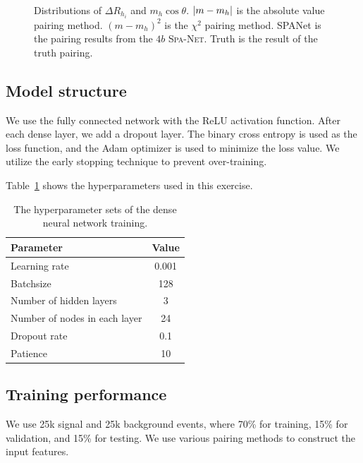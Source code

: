 \documentclass[12pt]{article}
\begin{document}
\begin{figure}[htpb]
{            } \\
            \caption{Distributions of $\Delta R_{h_i}$ and $m_{h} \cos\theta$. $\abs{m-m_h}$ is the absolute value pairing method. $(m-m_h)^2$ is the $\chi^2$ pairing method. SPANet is the pairing results from the $4b$ \textsc{Spa-Net}. Truth is the result of the truth pairing.}
            \label{fig:DNN_input_feature_various_pairing_method}
        \end{figure}
    \subsection{Model structure}%
    \label{sub:model_structure}
        We use the fully connected network with the ReLU activation function. After each dense layer, we add a dropout layer. The binary cross entropy is used as the loss function, and the Adam optimizer is used to minimize the loss value. We utilize the early stopping technique to prevent over-training.

        Table~\ref{tab:DNN_hyperparameters} shows the hyperparameters used in this exercise.
        \begin{table}[htpb]
            \centering
            \caption{The hyperparameter sets of the dense neural network training.}
            \label{tab:DNN_hyperparameters}
            \begin{tabular}{l|c}
            Parameter                     & Value \\ \hline
            Learning rate                 & 0.001 \\
            Batchsize                     & 128   \\
            Number of hidden layers       & 3     \\
            Number of nodes in each layer & 24    \\
            Dropout rate                  & 0.1   \\
            Patience                      & 10   
            \end{tabular}
        \end{table}
    \subsection{Training performance}%
    \label{sub:training_performance}
        We use 25k signal and 25k background events, where 70\% for training, 15\% for validation, and 15\% for testing. We use various pairing methods to construct the input features.
\end{document}
